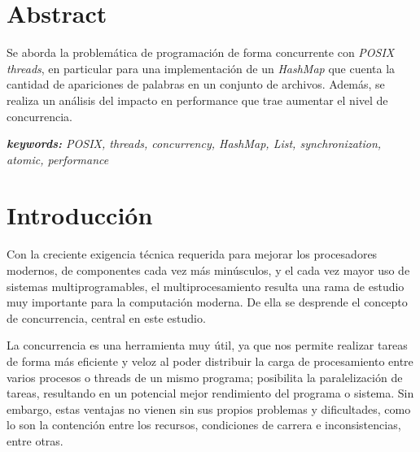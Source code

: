 \documentclass[a4paper]{article}
\begin{document}
\thispagestyle{empty}

\maketitle
\newpage

\thispagestyle{empty}
\vspace{3cm}
\setcounter{tocdepth}{4}
\setcounter{secnumdepth}{5}
\tableofcontents

\section{Abstract}

Se aborda la problemática de programación de forma concurrente con \textit{POSIX threads}, en particular para una implementación de un \textit{HashMap} que cuenta la cantidad de apariciones de palabras en un conjunto de archivos. Además, se realiza un análisis del impacto en performance que trae aumentar el nivel de concurrencia.

\textit{\textbf{keywords:} POSIX, threads, concurrency, HashMap, List, synchronization, atomic, performance}

\section{Introducción}

Con la creciente exigencia técnica requerida para mejorar los procesadores modernos, de componentes cada vez más minúsculos, y el cada vez mayor uso de sistemas multiprogramables, el multiprocesamiento resulta una rama de estudio muy importante para la computación moderna. De ella se desprende el concepto de concurrencia, central en este estudio.

La concurrencia es una herramienta muy útil, ya que nos permite realizar tareas de forma más eficiente y veloz al poder distribuir la carga de procesamiento entre varios procesos o threads de un mismo programa; posibilita la paralelización de tareas, resultando en un potencial mejor rendimiento del programa o sistema. Sin embargo, estas ventajas no vienen sin sus propios problemas y dificultades, como lo son la contención entre los recursos, condiciones de carrera e inconsistencias, entre otras.
\end{document}
